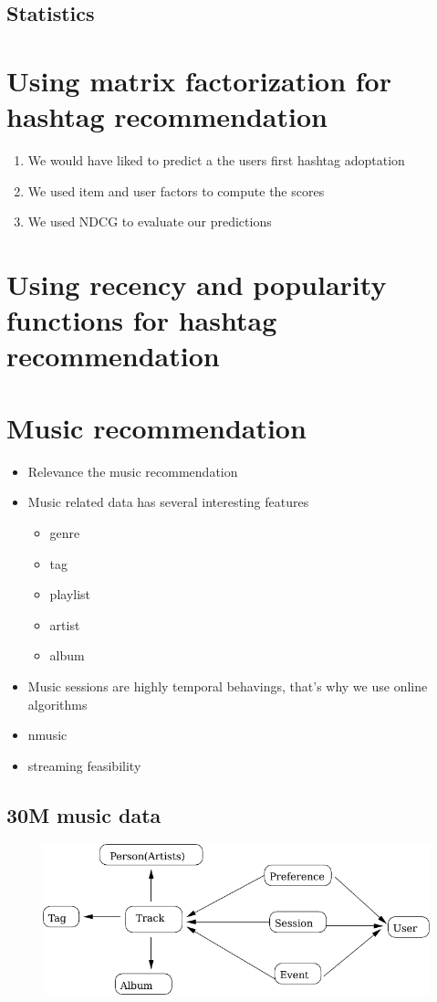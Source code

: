 \subsection{Statistics}

\section{Using matrix factorization for hashtag recommendation}
\begin{enumerate}
\item We would have liked to predict a the users first hashtag adoptation
\item We used item and user factors to compute the scores
\item We used NDCG to evaluate our predictions 
\end{enumerate}


\section{Using recency and popularity functions for hashtag recommendation}

\section{Music recommendation}

\begin{itemize}
\item Relevance the music recommendation
\item Music related data has several interesting features
  \begin{itemize}
  \item genre
  \item tag
  \item playlist
  \item artist
  \item album
  \end{itemize}
\item Music sessions are highly temporal behavings, that's why we use online
  algorithms
\item nmusic
\item streaming feasibility
\end{itemize}

\subsection{30M music data}
\begin{figure}[h]
\centering
\includegraphics[scale=1]{tex/pic/30m_data_structure.pdf}
\end{figure}


